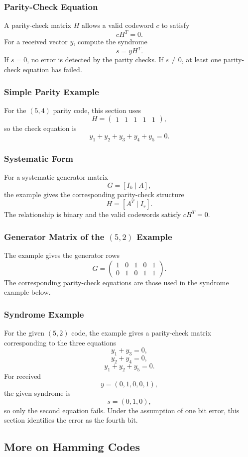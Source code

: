 \documentclass[12pt]{article}
\begin{document}
\subsubsection{Parity-Check Equation}
A parity-check matrix $H$ allows a valid codeword $c$ to satisfy
\[
cH^T=0.
\]
For a received vector $y$, compute the syndrome
\[
s=yH^T.
\]
If $s=0$, no error is detected by the parity checks. If $s\ne0$, at least one parity-check equation has failed.

\subsubsection{Simple Parity Example}
For the $(5,4)$ parity code, this section uses
\[
H=\begin{pmatrix}1&1&1&1&1\end{pmatrix},
\]
so the check equation is
\[
y_1+y_2+y_3+y_4+y_5=0.
\]

\subsubsection{Systematic Form}
For a systematic generator matrix
\[
G=[I_k\mid A],
\]
the example gives the corresponding parity-check structure
\[
H=[A^T\mid I_r].
\]
The relationship is binary and the valid codewords satisfy $cH^T=0$.

\subsubsection{Generator Matrix of the $(5,2)$ Example}
The example gives the generator rows
\[
G=\begin{pmatrix}
1&0&1&0&1\\
0&1&0&1&1
\end{pmatrix}.
\]
The corresponding parity-check equations are those used in the syndrome example below.

\subsubsection{Syndrome Example}
For the given $(5,2)$ code, the example gives a parity-check matrix corresponding to the three equations
\[
y_1+y_3=0,
\]
\[
y_2+y_4=0,
\]
\[
y_1+y_2+y_5=0.
\]
For received
\[
y=(0,1,0,0,1),
\]
the given syndrome is
\[
s=(0,1,0),
\]
so only the second equation fails. Under the assumption of one bit error, this section identifies the error as the fourth bit.

\subsection{More on Hamming Codes}
\end{document}

